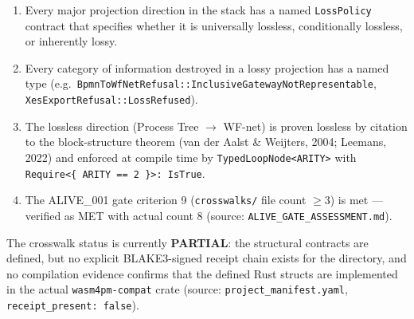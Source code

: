 \begin{enumerate}
  \item Every major projection direction in the stack has a named \texttt{LossPolicy} contract
        that specifies whether it is universally lossless, conditionally lossless, or inherently
        lossy.
  \item Every category of information destroyed in a lossy projection has a named type
        (e.g.\ \texttt{BpmnToWfNetRefusal::InclusiveGatewayNotRepresentable},
        \texttt{XesExportRefusal::LossRefused}).
  \item The lossless direction (Process Tree $\to$ WF-net) is proven lossless by citation to
        the block-structure theorem (van der Aalst \& Weijters, 2004; Leemans, 2022) and
        enforced at compile time by \texttt{TypedLoopNode<ARITY>} with
        \texttt{Require<\{ ARITY == 2 \}>: IsTrue}.
  \item The \textsc{ALIVE\_001} gate criterion 9 (\texttt{crosswalks/} file count $\geq 3$) is
        met --- verified as MET with actual count 8 (source: \texttt{ALIVE\_GATE\_ASSESSMENT.md}).
\end{enumerate}

The crosswalk status is currently \textbf{PARTIAL}: the structural contracts are defined, but no
explicit \textsc{BLAKE3}-signed receipt chain exists for the directory, and no compilation
evidence confirms that the defined Rust structs are implemented in the actual
\texttt{wasm4pm-compat} crate (source: \texttt{project\_manifest.yaml},
\texttt{receipt\_present: false}).

